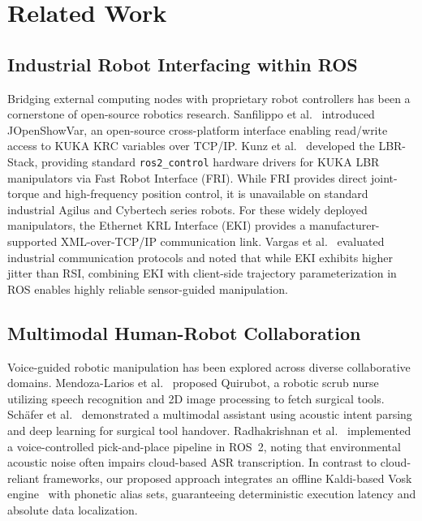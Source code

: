 \documentclass[runningheads]{llncs}
\begin{document}
\section{Related Work}
\label{sec:related_work}

\subsection{Industrial Robot Interfacing within ROS}
Bridging external computing nodes with proprietary robot controllers has been a cornerstone of open-source robotics research. Sanfilippo et al.~\cite{jopenshowvar2015} introduced JOpenShowVar, an open-source cross-platform interface enabling read/write access to KUKA KRC variables over TCP/IP. Kunz et al.~\cite{lbr_stack2024} developed the LBR-Stack, providing standard \texttt{ros2\_control} hardware drivers for KUKA LBR manipulators via Fast Robot Interface (FRI). While FRI provides direct joint-torque and high-frequency position control, it is unavailable on standard industrial Agilus and Cybertech series robots. For these widely deployed manipulators, the Ethernet KRL Interface (EKI) provides a manufacturer-supported XML-over-TCP/IP communication link. Vargas et al.~\cite{kuka_eki_eval2022} evaluated industrial communication protocols and noted that while EKI exhibits higher jitter than RSI, combining EKI with client-side trajectory parameterization in ROS enables highly reliable sensor-guided manipulation.

\subsection{Multimodal Human-Robot Collaboration}
Voice-guided robotic manipulation has been explored across diverse collaborative domains. Mendoza-Larios et al.~\cite{quirubot2016} proposed Quirubot, a robotic scrub nurse utilizing speech recognition and 2D image processing to fetch surgical tools. Schäfer et al.~\cite{schafer2023smart} demonstrated a multimodal assistant using acoustic intent parsing and deep learning for surgical tool handover. Radhakrishnan et al.~\cite{voice_ros2_2024} implemented a voice-controlled pick-and-place pipeline in ROS~2, noting that environmental acoustic noise often impairs cloud-based ASR transcription. In contrast to cloud-reliant frameworks, our proposed approach integrates an offline Kaldi-based Vosk engine~\cite{vosk2020} with phonetic alias sets, guaranteeing deterministic execution latency and absolute data localization.
\end{document}
